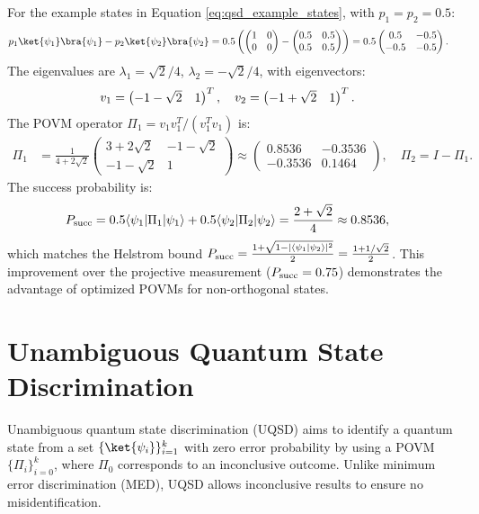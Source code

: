 For the example states in Equation \ref{eq:qsd_example_states}, with \(p_1 = p_2 = 0.5\):
\begin{align}
    p_1 \ket{\psi_1}\bra{\psi_1} - p_2 \ket{\psi_2}\bra{\psi_2} & = 0.5 \left( \begin{pmatrix} 1 & 0 \\ 0 & 0 \end{pmatrix} - \begin{pmatrix} 0.5 & 0.5 \\ 0.5 & 0.5 \end{pmatrix} \right) = 0.5 \begin{pmatrix} 0.5 & -0.5 \\ -0.5 & -0.5 \end{pmatrix}. \label{eq:med_operator}
\end{align}
The eigenvalues are \(\lambda_1 = \sqrt{2}/4\), \(\lambda_2 = -\sqrt{2}/4\), with eigenvectors:
\begin{align}
    v_1 & = \begin{pmatrix} -1 - \sqrt{2} & 1 \end{pmatrix}^T, \quad v_2 = \begin{pmatrix} -1 + \sqrt{2} & 1 \end{pmatrix}^T. \notag
\end{align}
The POVM operator \(\Pi_1 = v_1 v_1^T / (v_1^T v_1)\) is:
\begin{align}
    \Pi_1 & = \frac{1}{4 + 2\sqrt{2}} \begin{pmatrix} 3 + 2\sqrt{2} & -1 - \sqrt{2} \\ -1 - \sqrt{2} & 1 \end{pmatrix} \approx \begin{pmatrix} 0.8536 & -0.3536 \\ -0.3536 & 0.1464 \end{pmatrix}, \quad \Pi_2 = I - \Pi_1. \label{eq:med_povm}
\end{align}
The success probability is:
\begin{align}
    P_{\mathrm{succ}} & = 0.5 \langle \psi_1 | \Pi_1 | \psi_1 \rangle + 0.5 \langle \psi_2 | \Pi_2 | \psi_2 \rangle = \frac{2 + \sqrt{2}}{4} \approx 0.8536, \label{eq:med_psucc_result}
\end{align}
which matches the Helstrom bound \(P_{\mathrm{succ}} = \frac{1 + \sqrt{1 - |\langle \psi_1 | \psi_2 \rangle|^2}}{2} = \frac{1 + 1/\sqrt{2}}{2}\).
This improvement over the projective measurement (\(P_{\mathrm{succ}} = 0.75\))
demonstrates the advantage of optimized POVMs for non-orthogonal states.

\section{Unambiguous Quantum State Discrimination}
\label{sec:uqsd}
Unambiguous quantum state discrimination (UQSD) \cite{RN493, RN494, RN495}
aims to identify a quantum state from a set \(\{ \ket{\psi_i} \}_{i=1}^k\)
with zero error probability by using a POVM \(\{ \Pi_i \}_{i=0}^k\), where
\(\Pi_0\) corresponds to an inconclusive outcome.
Unlike minimum error discrimination (MED), UQSD allows inconclusive results to
ensure no misidentification.

